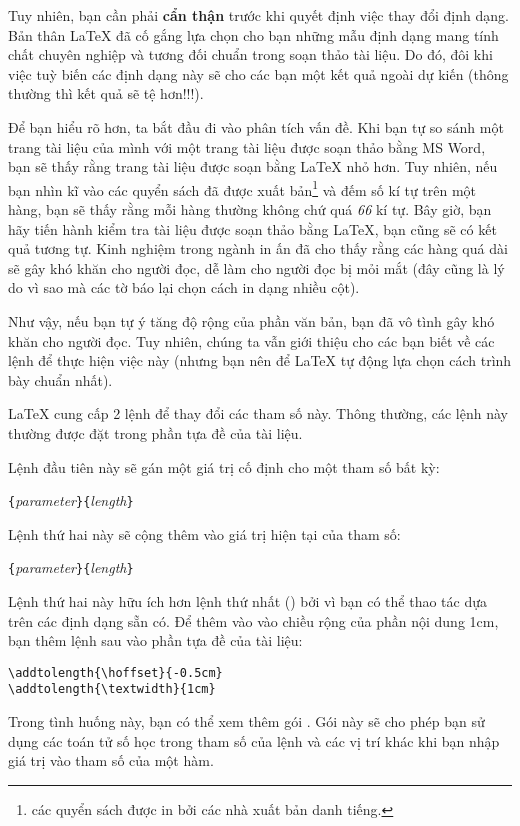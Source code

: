 Tuy nhiên, bạn cần phải \textbf{cẩn thận} trước khi quyết định
việc thay đổi định dạng. Bản thân \LaTeX{} đã cố gắng lựa chọn cho
bạn những mẫu định dạng mang tính chất chuyên nghiệp và tương đối
chuẩn trong soạn thảo tài liệu. Do đó, đôi khi việc tuỳ biến các
định dạng này sẽ cho các bạn một kết quả ngoài dự kiến (thông
thường thì kết quả sẽ tệ hơn!!!).

Để bạn hiểu rõ hơn, ta bắt đầu đi vào phân tích vấn đề. Khi bạn tự
so sánh một trang tài liệu của mình với một trang tài liệu được
soạn thảo bằng MS Word, bạn sẽ thấy rằng trang tài liệu được soạn
bằng \LaTeX{} nhỏ hơn. Tuy nhiên, nếu bạn nhìn kĩ vào các quyển
sách đã được xuất bản\footnote{các quyển sách được in bởi các nhà
xuất bản danh tiếng.} và đếm số kí tự trên một hàng, bạn sẽ thấy
rằng mỗi hàng thường không chứ quá \emph{66} kí tự. Bây giờ, bạn
hãy tiến hành kiểm tra tài liệu được soạn thảo bằng \LaTeX{}, bạn
cũng sẽ có kết quả tương tự. Kinh nghiệm trong ngành in ấn đã cho
thấy rằng các hàng quá dài sẽ gây khó khăn cho người đọc, dễ làm
cho người đọc bị mỏi mắt (đây cũng là lý do vì sao mà các tờ báo
lại chọn cách in dạng nhiều cột).

Như vậy, nếu bạn tự ý tăng độ rộng của phần văn bản, bạn đã vô
tình gây khó khăn cho người đọc. Tuy nhiên, chúng ta vẫn giới
thiệu cho các bạn biết về các lệnh để thực hiện việc này (nhưng
bạn nên để \LaTeX{} tự động lựa chọn cách trình bày chuẩn nhất).

\LaTeX{} cung cấp 2 lệnh để thay đổi các tham số này. Thông
thường, các lệnh này thường được đặt trong phần tựa đề của tài
liệu.

Lệnh đầu tiên này sẽ gán một giá trị cố định cho một tham số bất
kỳ:

\begin{lscommand}
\verb|{|\emph{parameter}\verb|}{|\emph{length}\verb|}|
\end{lscommand}

Lệnh thứ hai này sẽ cộng thêm vào giá trị hiện tại của tham số:
\begin{lscommand}
\verb|{|\emph{parameter}\verb|}{|\emph{length}\verb|}|
\end{lscommand}
Lệnh thứ hai này hữu ích hơn lệnh thứ nhất () bởi vì
bạn có thể thao tác dựa trên các định dạng sẵn có. Để thêm vào vào
chiều rộng của phần nội dung 1cm, bạn thêm lệnh sau vào phần tựa
đề của tài liệu:
\begin{code}
\verb|\addtolength{\hoffset}{-0.5cm}|\\
\verb|\addtolength{\textwidth}{1cm}|
\end{code}
Trong tình huống này, bạn có thể xem thêm gói . Gói này
sẽ cho phép bạn sử dụng các toán tử số học trong tham số của lệnh
 và các vị trí khác khi bạn nhập giá trị vào tham số
của một hàm.

